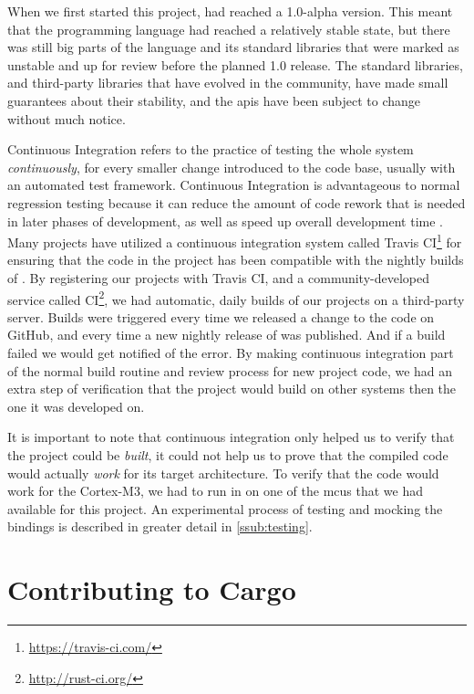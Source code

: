 When we first started this project, {\rust} had reached a 1.0-alpha version.
This meant that the programming language had reached a relatively stable state, but there was still big parts of the language and its standard libraries that were marked as unstable and up for review before the planned 1.0 release.
The standard libraries, and third-party {\rust} libraries that have evolved in the {\rust} community, have made small guarantees about their stability, and the \glspl{api} have been subject to change without much notice.

Continuous Integration refers to the practice of testing the whole system \emph{continuously}, for every smaller change introduced to the code base, usually with an automated test framework.
Continuous Integration is advantageous to normal regression testing because it can reduce the amount of code rework that is needed in later phases of development, as well as speed up overall development time  \cite{Orso2014}.
Many {\rust} projects have utilized a continuous integration system called Travis CI\footnote{\url{https://travis-ci.com/}} for ensuring that the code in the project has been compatible with the nightly builds of {\rust}.
By registering our projects with Travis CI, and a community-developed service called {\rust} CI\footnote{\url{http://rust-ci.org/}}, we had automatic, daily builds of our projects on a third-party server.
Builds were triggered every time we released a change to the code on GitHub, and every time a new nightly release of {\rust} was published.
And if a build failed we would get notified of the error.
By making continuous integration part of the normal build routine and review process for new project code, we had an extra step of verification that the project would build on other systems then the one it was developed on.

It is important to note that continuous integration only helped us to verify that the project could be \emph{built}, it could not help us to prove that the compiled code would actually \emph{work} for its target architecture.
To verify that the code would work for the Cortex-M3, we had to run in on one of the \glspl{mcu} that we had available for this project.
An experimental process of testing and mocking the {\rg} bindings is described in greater detail in \autoref{ssub:testing}.

\section{Contributing to Cargo}
\label{ssub:contributing_to_cargo}

